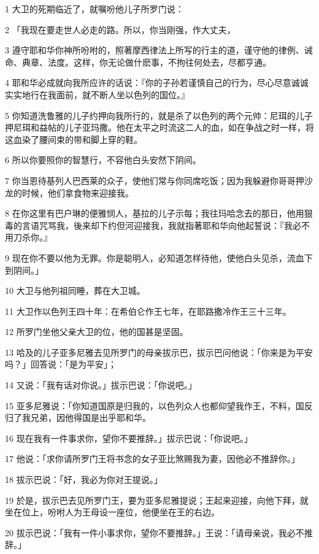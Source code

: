 \par 1 大卫的死期临近了，就嘱吩他儿子所罗门说：
\par 2 「我现在要走世人必走的路。所以，你当刚强，作大丈夫，
\par 3 遵守耶和华你神所吩咐的，照著摩西律法上所写的行主的道，谨守他的律例、诫命、典章、法度。这样，你无论做什麽事，不拘往何处去，尽都亨通。
\par 4 耶和华必成就向我所应许的话说：『你的子孙若谨慎自己的行为，尽心尽意诚诚实实地行在我面前，就不断人坐以色列的国位。』
\par 5 你知道洗鲁雅的儿子约押向我所行的，就是杀了以色列的两个元帅：尼珥的儿子押尼珥和益帖的儿子亚玛撒。他在太平之时流这二人的血，如在争战之时一样，将这血染了腰间束的带和脚上穿的鞋。
\par 6 所以你要照你的智慧行，不容他白头安然下阴间。
\par 7 你当恩待基列人巴西莱的众子，使他们常与你同席吃饭；因为我躲避你哥哥押沙龙的时候，他们拿食物来迎接我。
\par 8 在你这里有巴户琳的便雅悯人，基拉的儿子示每；我往玛哈念去的那日，他用狠毒的言语咒骂我，後来却下约但河迎接我，我就指著耶和华向他起誓说：『我必不用刀杀你。』
\par 9 现在你不要以他为无罪。你是聪明人，必知道怎样待他，使他白头见杀，流血下到阴间。」
\par 10 大卫与他列祖同睡，葬在大卫城。
\par 11 大卫作以色列王四十年：在希伯仑作王七年，在耶路撒冷作王三十三年。
\par 12 所罗门坐他父亲大卫的位，他的国甚是坚固。
\par 13 哈及的儿子亚多尼雅去见所罗门的母亲拔示巴，拔示巴问他说：「你来是为平安吗？」回答说：「是为平安」；
\par 14 又说：「我有话对你说。」拔示巴说：「你说吧。」
\par 15 亚多尼雅说：「你知道国原是归我的，以色列众人也都仰望我作王，不料，国反归了我兄弟，因他得国是出乎耶和华。
\par 16 现在我有一件事求你，望你不要推辞。」拔示巴说：「你说吧。」
\par 17 他说：「求你请所罗门王将书念的女子亚比煞赐我为妻，因他必不推辞你。」
\par 18 拔示巴说：「好，我必为你对王提说。」
\par 19 於是，拔示巴去见所罗门王，要为亚多尼雅提说；王起来迎接，向他下拜，就坐在位上，吩咐人为王母设一座位，他便坐在王的右边。
\par 20 拔示巴说：「我有一件小事求你，望你不要推辞。」王说：「请母亲说，我必不推辞。」
